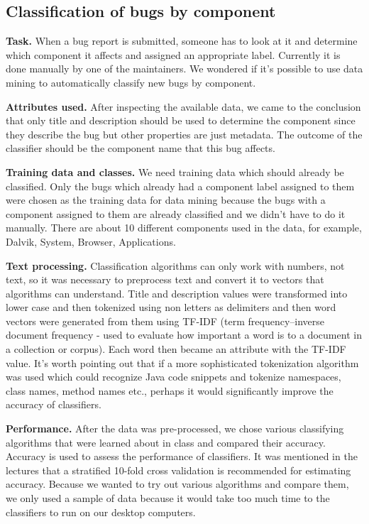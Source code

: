 \subsection{Classification of bugs by component} %
\label{sub:Classification of bugs bugs by component}

{\bf Task.} When a bug report is submitted, someone has to look at it and determine which component it affects and assigned an appropriate label. Currently it is done manually by one of the maintainers. We wondered if it's possible to use data mining to automatically classify new bugs by component.

{\bf Attributes used.} After inspecting the available data, we came to the conclusion that only title and description should be used to determine the component since they describe the bug but other properties are just metadata. The outcome of the classifier should be the component name that this bug affects.

{\bf Training data and classes.} We need training data which should already be classified. Only the bugs which already had a component label assigned to them were chosen as the training data for data mining because the bugs with a component assigned to them are already classified and we didn't have to do it manually. There are about 10 different components used in the data, for example, Dalvik, System, Browser, Applications.

{\bf Text processing.} Classification algorithms can only work with numbers, not text, so it was necessary to preprocess text and convert it to vectors that algorithms can understand. Title and description values were transformed into lower case and then tokenized using non letters as delimiters and then word vectors were generated from them using TF-IDF (term frequency–inverse document frequency - used to evaluate how important a word is to a document in a collection or corpus). Each word then became an attribute with the TF-IDF value. It's worth pointing out that if a more sophisticated tokenization algorithm was used which could recognize Java code snippets and tokenize namespaces, class names, method names etc., perhaps it would significantly improve the accuracy of classifiers.

{\bf Performance.} After the data was pre-processed, we chose various classifying algorithms that were learned about in class and compared their accuracy. Accuracy is used to assess the performance of classifiers. It was mentioned in the lectures that a stratified 10-fold cross validation is recommended for estimating accuracy. Because we wanted to try out various algorithms and compare them, we only used a sample of data because it would take too much time to the classifiers to run on our desktop computers.\newline

